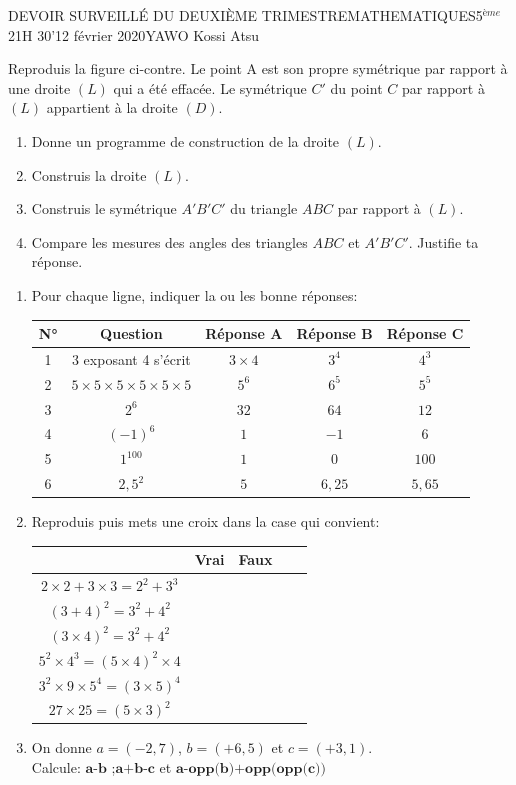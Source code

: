 \documentclass[12pt,a4paper]{book}
\newcommand{\prof}{YAWO Kossi Atsu}
\newcommand{\matiere}{MATHEMATIQUES}
\newcommand{\classe}{5$^{ème}$}
\begin{document}
\newpage
\begin{devoir}{DEVOIR SURVEILLÉ DU DEUXIÈME TRIMESTRE}{\matiere}{\classe}{2}{1H 30'}{12 février 2020}{\prof}
\begin{exo}[6]
Reproduis la figure ci-contre. Le point A est son propre symétrique par rapport à une droite $(L)$ qui a été effacée. Le symétrique $C'$ du point $C$ par rapport à $(L)$ appartient à la droite  $(D)$.
\begin{enumerate}
\item Donne un programme de construction de la droite $(L)$. 
\item Construis la droite $(L)$.
\item Construis le symétrique $A'B'C'$ du triangle $ABC$ par rapport à $(L)$.
\item Compare les mesures des angles des triangles $ABC$ et $A'B'C'$. Justifie ta réponse.
\end{enumerate}
\end{exo}

\begin{exo}[10]
\begin{enumerate}
\item Pour chaque ligne, indiquer la ou les bonne réponses:\\
\begin{tabular}{|c|c|c|c|c|}
\hline 
N° & Question & Réponse A & Réponse B & Réponse C \\ 
\hline 
1 & 3 exposant 4 s'écrit & $3 \times 4$ & $3^4$& $4^3$\\ 
\hline 
2 & $5\times5\times5\times5\times5\times5$ & $5^6$ & $6^5$ &$5^5$\\ 
\hline 
3 & $2^6$ & $32$ & $64$ &$12$ \\ 
\hline
4 & $(-1)^6$ & $1$ & $-1$ &$6$ \\ 
\hline
5 & $1^100$ & $1$ & $0$ &$100$ \\ 
\hline
6 & $2,5^2$ & $5$ & $6,25$ &$5,65$ \\ 
\hline
\end{tabular} 

\item Reproduis puis mets une croix dans la case qui convient:\\
\begin{tabular}{|c|c|c|c|c|}
\hline 
 & Vrai & Faux\\ 
\hline 
$2\times 2+3\times 3=2^2+3^3$ &  & \\ 
\hline 
$(3+4)^2=3^2+4^2$ &  & \\ 
\hline
$(3\times 4)^2=3^2+4^2$ &  & \\ 
\hline
$5^2\times 4^3=(5\times 4)^2\times 4$ &  & \\ 
\hline
$3^2\times 9\times 5^4=(3\times 5)^4$ &  & \\ 
\hline
$27 \times 25=(5\times 3)^2$ &  & \\ 
\hline
\end{tabular} 
\item On donne $a=(-2,7)$, $b=(+6,5)$ et $c=(+3,1)$. \\
Calcule:
$\textbf{a-b}$ \qquad ;\qquad $\textbf{a+b-c}$ \qquad et \qquad $\textbf{a-opp(b)+opp(opp(c))}$


\end{enumerate}
\end{exo}
\end{devoir}
\end{document}
